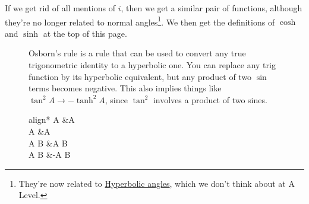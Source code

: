 \documentclass[../main.tex]{subfile}
\begin{document}
If we get rid of all mentions of $i$, then we get a similar pair of functions, although they're no longer related to normal angles\footnote{They're now related to \href{https://en.wikipedia.org/wiki/Hyperbolic_angle}{Hyperbolic angles}, which we don't think about at A Level.}. We then get the definitions of $\cosh$ and $\sinh$ at the top of this page.

\vspace{-2ex}

\begin{figure}[H]
	\hspace{0.03\linewidth}
	\begin{minipage}{0.5\linewidth}
		Osborn's rule is a rule that can be used to convert any true trigonometric identity to a hyperbolic one. You can replace any trig function by its hyperbolic equivalent, but any product of two $\sin$ terms becomes negative. This also implies things like $\tan^2 A \rightarrow -\tanh^2 A$, since $\tan^2$ involves a product of two sines.
	\end{minipage}\hspace{0.06\linewidth}
	\begin{minipage}{0.3\linewidth}
	\begin{empheq}[box=\rememberBox]{align*}
		\cos A &\rightarrow \cosh A\\
		\sin A &\rightarrow \sinh A\\
		\cos A \cos B &\rightarrow \cosh A \cosh B\\
		\sin A \sin B &\rightarrow -\sinh A \sinh B
	\end{empheq}
	\end{minipage}
	\hfill
\end{figure}
\end{document}

